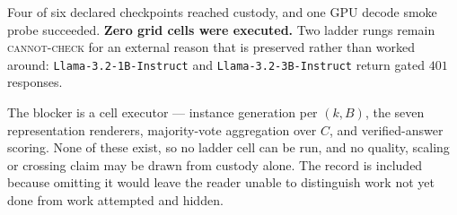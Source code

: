 Four of six declared checkpoints reached custody, and one GPU decode smoke probe
succeeded. \textbf{Zero grid cells were executed.} Two ladder rungs remain
\textsc{cannot-check} for an external reason that is preserved rather than worked
around: \texttt{Llama-3.2-1B-Instruct} and \texttt{Llama-3.2-3B-Instruct} return
gated $401$ responses.

The blocker is a cell executor --- instance generation per $(k,B)$, the seven
representation renderers, majority-vote aggregation over $C$, and verified-answer
scoring. None of these exist, so no ladder cell can be run, and no quality, scaling
or crossing claim may be drawn from custody alone. The record is included because
omitting it would leave the reader unable to distinguish work not yet done from work
attempted and hidden.
